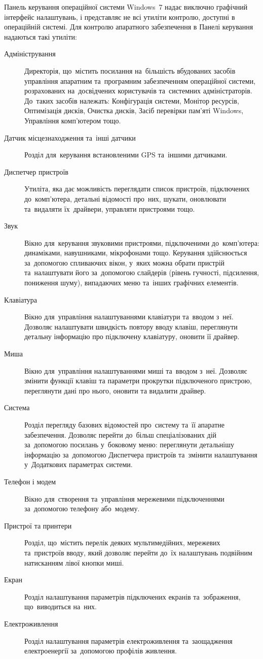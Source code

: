 \documentclass[
	a4paper,
	oneside,
	DIV = 12,
	12pt,
	headings = normal,
]{scrartcl}
\newcommand{\allcaps}[1]{{\addfontfeatures{LetterSpace = 5}#1}}
\begin{document}
			Панель керування операційної системи Windows~7 надає виключно графічний інтерфейс налаштувань, і представляє не всі утиліти контролю, доступні в операційній системі. Для контролю апаратного забезпечення в Панелі керування надаються такі утиліти:
			\begin{description}
				\item [Адміністрування] Директорія, що~містить посилання на~більшість вбудованих засобів управління апаратним та~програмним забезпеченням операційної системи, розрахованих на~досвідчених користувачів та~системних адміністраторів. До~таких засобів належать: Конфігурація системи, Монітор ресурсів, Оптимізація дисків, Очистка дисків, Засіб перевірки пам\-'я\-ті Windows, Управління комп\-'ю\-те\-ром тощо.
				\item [Датчик місцезнаходження та~інші датчики] Розділ для~керування встановленими \allcaps{GPS} та~іншими датчиками.
				\item [Диспетчер пристроїв] Утиліта, яка дає можливість переглядати список пристроїв, підключених до~ком\-п'\-ю\-те\-ра, детальні відомості про~них, шукати, оновлювати та~видаляти їх~драйвери, управляти пристроями тощо.
				\item [Звук] Вікно для~керування звуковими пристроями, підключеними до~ком\-п'\-ю\-те\-ра: динаміками, навушниками, мікрофонами тощо. Керування здійснюється за~допомогою спливаючих вікон, у~яких можна обрати пристрій та~налаштувати його за~допомогою слайдерів (рівень гучності, підсилення, пониження шуму), випадаючих меню та~інших графічних елементів.
				\item [Клавіатура] Вікно для~управління налаштуваннями клавіатури та~вводом з~неї. Дозволяє налаштувати швидкість повтору вводу клавіш, переглянути детальну інформацію про підключену клавіатуру, оновити її драйвер.
				\item [Миша] Вікно для~управління налаштуваннями миші та~вводом з~неї. Дозволяє змінити функції клавіш та параметри прокрутки підключеного пристрою, переглянути дані про нього, оновити та видалити драйвер.
				\item [Система] Розділ перегляду базових відомостей про~систему та~її апаратне забезпечення. Дозволяє перейти до~більш спеціалізованих дій за~допомогою посилань у~боковому меню: переглянути детальнішу інформацію за~допомогою Диспетчера пристроїв та~змінити налаштування у~Додаткових параметрах системи.
				\item [Телефон і модем] Вікно для~створення та~управління мережевими підключеннями за~допомогою телефону або~модему.
				\item [Пристрої та принтери] Розділ, що~містить перелік деяких мультимедійних, мережевих та~пристроїв вводу, який дозволяє перейти до~їх налаштувань подвійним натисканням лівої кнопки миші.
				\item [Екран] Розділ налаштування параметрів підключених екранів та~зображення, що~виводиться на~них. 
				\item [Електроживлення] Розділ налаштування параметрів електроживлення та~заощадження електроенергії за~допомогою профілів живлення.
			\end{description}
\end{document}
